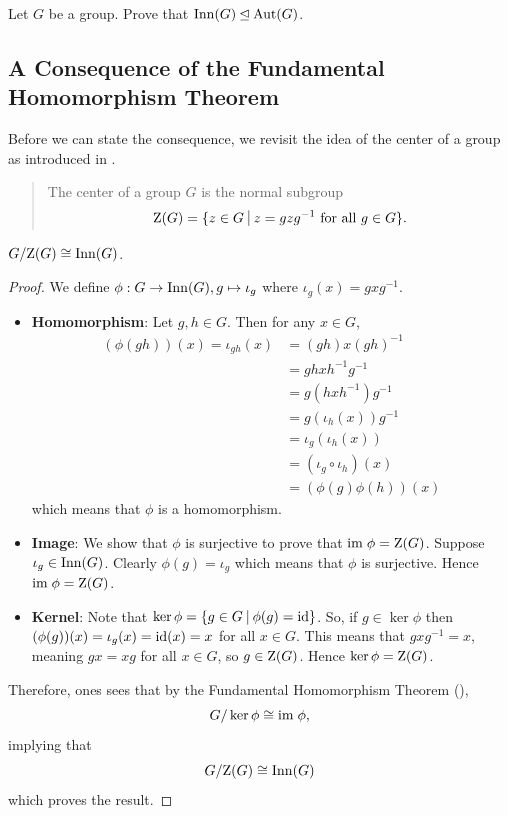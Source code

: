\begin{exercise}
    Let $G$ be a group. Prove that $\mathrm{Inn}(G) \unlhd \mathrm{Aut}(G)$.
\end{exercise}

\subsection{A Consequence of the Fundamental Homomorphism Theorem}
Before we can state the consequence, we revisit the idea of the center of a group as introduced in .
\begin{quote}
    The center of a group $G$ is the normal subgroup
    \[
        \Z{G} = \{z \in G \vert z = gzg^{-1} \text{ for all } g \in G\}.
    \]
\end{quote}

\begin{proposition}
    $G/\mathrm{Z}(G) \cong \mathrm{Inn}(G)$.
\end{proposition}
\begin{proof}
    We define $\phi: G \to \mathrm{Inn}(G), g \mapsto \iota_g$ where $\iota_g(x) = gxg^{-1}$.
    \begin{itemize}
        \item \textbf{Homomorphism}: Let $g, h \in G$. Then for any $x \in G$,
        \begin{align*}
            (\phi(gh))(x) = \iota_{gh}(x) &= (gh)x(gh)^{-1}\\
            &= gh x h^{-1}g^{-1}\\
            &= g(hxh^{-1})g^{-1}\\
            &= g(\iota_h(x))g^{-1}\\
            &=\iota_g(\iota_h(x))\\
            &=(\iota_g\circ\iota_h)(x)\\
            &=(\phi(g)\phi(h))(x)
        \end{align*}
        which means that $\phi$ is a homomorphism.

        \item \textbf{Image}: We show that $\phi$ is surjective to prove that $\mathrm{im}\; \phi = \mathrm{Z}(G)$. Suppose $\iota_g \in \mathrm{Inn}(G)$. Clearly $\phi(g) = \iota_g$ which means that $\phi$ is surjective. Hence $\mathrm{im}\;\phi = \mathrm{Z}(G)$.

        \item \textbf{Kernel}: Note that $\ker\phi = \{g \in G \vert \phi(g) = \id\}$. So, if $g \in \ker\phi$ then $(\phi(g))(x) = \iota_g(x) = \mathrm{id}(x) = x$ for all $x \in G$. This means that $gxg^{-1} = x$, meaning $gx = xg$ for all $x \in G$, so $g \in \mathrm{Z}(G)$. Hence $\ker\phi = \mathrm{Z}(G)$.
    \end{itemize}
    Therefore, ones sees that by the Fundamental Homomorphism Theorem (),
    \[
        G/\ker\phi \cong \mathrm{im}\;\phi,
    \]
    implying that
    \[
        G/\mathrm{Z}(G) \cong \mathrm{Inn}(G)    
    \]
    which proves the result.
\end{proof}

